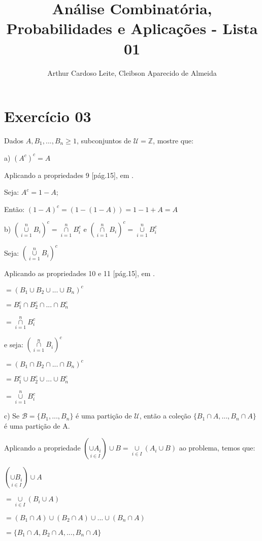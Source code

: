 \documentclass[12pt]{article}
\title{Análise Combinatória, Probabilidades e Aplicações - Lista 01}
\author{{Arthur Cardoso Leite}, {Cleibson Aparecido de Almeida}}
\begin{document}
\maketitle

\section*{Exercício 03}

Dados $A, B_1, ... , B_n \geq 1$, subconjuntos de $\mathcal{U} = \mathbb{Z}$, mostre que:

a) $(A^c)^c = A$

Aplicando a propriedades 9 [pág.15], em \cite{morgado_1991}.

Seja: $A^c = 1-A$;

Então: $(1-A)^c = (1-(1-A)) = 1-1+A = A$

\bigskip

b) $(\overset{n}{\underset{i=1}{\cup}} B_i)^c = \overset{n}{\underset{i=1}{\cap}} B_i^c$ e $(\overset{n}{\underset{i=1}{\cap}} B_i)^c = \overset{n}{\underset{i=1}{\cup}} B_i^c$

Seja: $(\overset{n}{\underset{i=1}{\cup}} B_i)^c$

Aplicando as propriedades 10 e 11 [pág.15], em \cite{morgado_1991}. 

$= (B_1 \cup B_2 \cup ... \cup B_n)^c$

$= B_1^c \cap B_2^c \cap ... \cap B_n^c$

$= \overset{n}{\underset{i=1}{\cap}} B_i^c$

e seja: $(\overset{n}{\underset{i=1}{\cap}} B_i)^c$

$= (B_1 \cap B_2 \cap ... \cap B_n)^c$

$= B_1^c \cup B_2^c \cup ... \cup B_n^c$

$= \overset{n}{\underset{i=1}{\cup}} B_i^c$

\bigskip

c) Se $\mathcal{B}=\{B_1,...,B_n\}$ é uma partição de $\mathcal{U}$, então a coleção $\{B_1 \cap A, ..., B_n \cap A\}$ é uma partição de A.

Aplicando a propriedade $(\underset{i \in I}{\cup A_i}) \cup B = \underset{i \in I}{\cup} (A_i \cup B)$ ao problema, temos que:

$(\underset{i \in I}{\cup B_i}) \cup A$

$= \underset{i \in I}{\cup} (B_i \cup A)$

$=(B_1 \cap A) \cup (B_2 \cap A) \cup ... \cup (B_n \cap A)$

$=\{B_1 \cap A, B_2 \cap A, ... , B_n \cap A\}$
\end{document}
